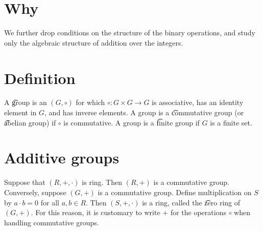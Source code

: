 

\section*{Why}

We further drop conditions on the structure of the binary operations, and study only the algebraic structure of addition over the integers.

\section*{Definition}

A \t{group} is an $(G, \circ)$ for which $\circ: G \times  G \to G$ is associative, has an identity element in $G$, and has inverse elements.
A group is a \t{commutative group} (or \t{abelian group}) if $\circ$ is commutative.
A group is a \t{finite group} if $G$ is a finite set.

\section*{Additive groups}

Suppose that $(R, +, \cdot )$ is ring.
Then $(R, +)$ is a commutative group.
Conversely, suppose $(G, +)$ is a commutative group.
Define multiplication on $S$ by $a\cdot b = 0$ for all $a, b \in R$.
Then $(S, +, \cdot )$ is a ring, called the \t{zero ring} of $(G, +)$.
For this reason, it is customary to write $+$ for the operations $\circ$ when handling commutative groups.

\blankpage